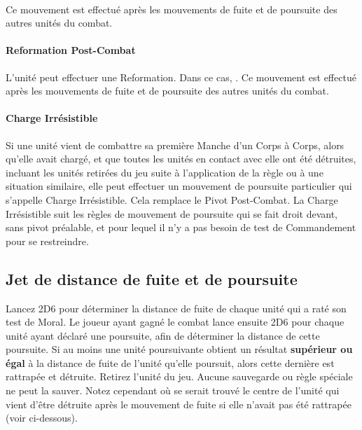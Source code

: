 \paragraph{}

 Ce mouvement est effectué après les mouvements de fuite et de poursuite des autres unités du combat.

\paragraph{Reformation Post-Combat}

L'unité peut effectuer une Reformation. Dans ce cas, . Ce mouvement est effectué après les mouvements de fuite et de poursuite des autres unités du combat.

\paragraph{Charge Irrésistible}

Si une unité vient de combattre sa première Manche d'un Corps à Corps, alors qu'elle avait chargé, et que toutes les unités en contact avec elle ont été détruites, incluant les unités retirées du jeu suite à l'application de la règle \unstable{} ou à une situation similaire, elle peut effectuer un mouvement de poursuite particulier qui s'appelle Charge Irrésistible. Cela remplace le Pivot Post-Combat. La Charge Irrésistible suit les règles de mouvement de poursuite qui se fait droit devant, sans pivot préalable, et pour lequel il n'y a pas besoin de test de Commandement pour se restreindre.

\subsection{Jet de distance de fuite et de poursuite}

Lancez 2D6 pour déterminer la distance de fuite de chaque unité qui a raté son test de Moral. Le joueur ayant gagné le combat lance ensuite 2D6 pour chaque unité ayant déclaré une poursuite, afin de déterminer la distance de cette poursuite. Si au moins une unité poursuivante obtient un résultat \textbf{supérieur ou égal} à la distance de fuite de l'unité qu'elle poursuit, alors cette dernière est rattrapée et détruite. Retirez l'unité du jeu. Aucune sauvegarde ou règle spéciale ne peut la sauver. Notez cependant où se serait trouvé le centre de l'unité qui vient d'être détruite après le mouvement de fuite si elle n'avait pas été rattrapée (voir ci-dessous).

